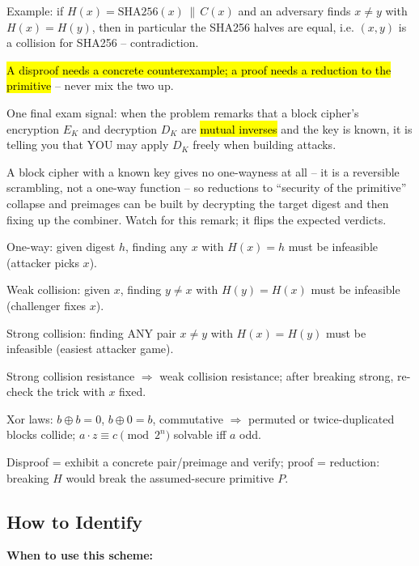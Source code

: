 \documentclass[12pt, a4paper]{article}
\newcommand{\imp}[1]{\hl{#1}}                       %
\begin{document}
Example: if $H(x) = \mathrm{SHA256}(x) \,\|\, C(x)$ and an adversary finds $x \neq y$ with $H(x) = H(y)$, then in particular the SHA256 halves are equal, i.e. $(x,y)$ is a collision for SHA256 -- contradiction.

\imp{A disproof needs a concrete counterexample; a proof needs a reduction to the primitive} -- never mix the two up.

One final exam signal: when the problem remarks that a block cipher's encryption $E_K$ and decryption $D_K$ are \imp{mutual inverses} and the key is known, it is telling you that YOU may apply $D_K$ freely when building attacks.

A block cipher with a known key gives no one-wayness at all -- it is a reversible scrambling, not a one-way function -- so reductions to ``security of the primitive'' collapse and preimages can be built by decrypting the target digest and then fixing up the combiner. Watch for this remark; it flips the expected verdicts.

\begin{theorybox}
\begin{tightitem}
    \item One-way: given digest $h$, finding any $x$ with $H(x)=h$ must be infeasible (attacker picks $x$).
    \item Weak collision: given $x$, finding $y \neq x$ with $H(y)=H(x)$ must be infeasible (challenger fixes $x$).
    \item Strong collision: finding ANY pair $x \neq y$ with $H(x)=H(y)$ must be infeasible (easiest attacker game).
    \item Strong collision resistance $\Rightarrow$ weak collision resistance; after breaking strong, re-check the trick with $x$ fixed.
    \item Xor laws: $b \oplus b = 0$, $b \oplus 0 = b$, commutative $\Rightarrow$ permuted or twice-duplicated blocks collide; $a \cdot z \equiv c \pmod{2^n}$ solvable iff $a$ odd.
    \item Disproof = exhibit a concrete pair/preimage and verify; proof = reduction: breaking $H$ would break the assumed-secure primitive $P$.
\end{tightitem}
\end{theorybox}

\subsection*{How to Identify}

\textbf{When to use this scheme:}
\end{document}
